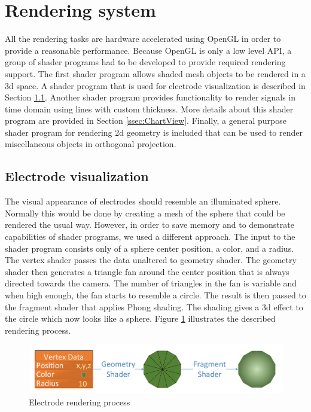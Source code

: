 \section{Rendering system}
\label{sec:implRendering}
All the rendering tasks are hardware accelerated using OpenGL in order to provide a reasonable performance. Because OpenGL is only a low level API, a group of shader programs had to be developed to provide required rendering support. The first shader program allows shaded mesh objects to be rendered in a \gls{3d} space. A shader program that is used for electrode visualization is described in Section \ref{ssec:implElVis}. Another shader program provides functionality to render signals in time domain using lines with custom thickness. More details about this shader program are provided in Section \ref{ssec:ChartView}. Finally, a general purpose shader program for rendering \gls{2d} geometry is included that can be used to render miscellaneous objects in orthogonal projection.  

\subsection{Electrode visualization}
\label{ssec:implElVis}
The visual appearance of electrodes should resemble an illuminated sphere. Normally this would be done by creating a mesh of the sphere that could be rendered the usual way. However, in order to save memory and to demonstrate capabilities of shader programs, we used a different approach. The input to the shader program consists only of a sphere center position, a color, and a radius. The vertex shader passes the data unaltered to geometry shader. The geometry shader then generates a triangle fan around the center position that is always directed towards the camera. The number of triangles in the fan is variable and when high enough, the fan starts to resemble a circle. The result is then passed to the fragment shader that applies Phong shading. The shading gives a \gls{3d} effect to the circle which now looks like a sphere. Figure \ref{fig:ElRender} illustrates the described rendering process.

\begin{figure}[htb]
	\centering
	\includegraphics[width=1\linewidth]{fig/ElRender.pdf}
	\caption{Electrode rendering process}
	\label{fig:ElRender}
\end{figure}

